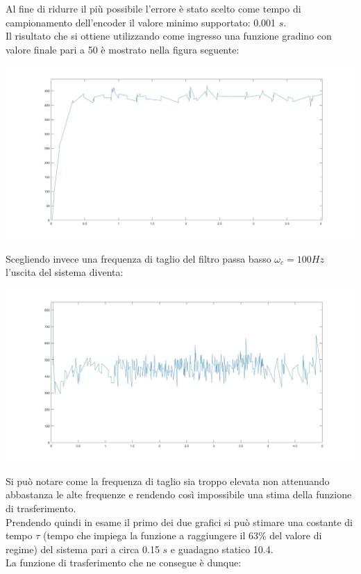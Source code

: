 Al fine di ridurre il più possibile l'errore è stato scelto come tempo di campionamento dell'encoder il valore minimo supportato: 0.001 $s$.\\
Il risultato che si ottiene utilizzando come ingresso una funzione gradino con valore finale pari a 50 è mostrato nella figura seguente:
\begin{center}
	\includegraphics[width=\textwidth]{motore50StepCamp1000.jpg}
\end{center}
Scegliendo invece una frequenza di taglio del filtro passa basso $\omega_c = 100Hz$ l'uscita del sistema diventa:
\begin{center}
	\includegraphics[width=\textwidth]{motore50StepCamp1000Polo100.jpg}
\end{center}
Si può notare come la frequenza di taglio sia troppo elevata non attenuando abbastanza le alte frequenze e rendendo così impossibile una stima della funzione di trasferimento.\\
Prendendo quindi in esame il primo dei due grafici si può stimare una costante di tempo $\tau$ (tempo che impiega la funzione a raggiungere il 63\% del valore di regime) del sistema pari a circa 0.15 $s$ e guadagno statico 10.4.\\
La funzione di trasferimento che ne consegue è dunque:

